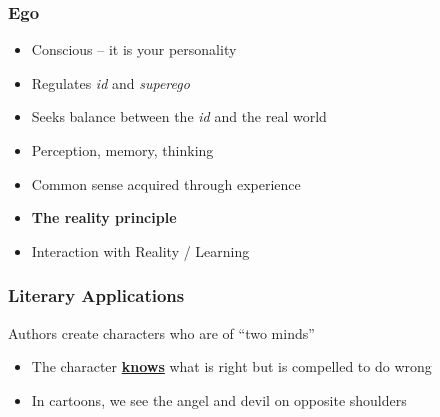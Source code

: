 \documentclass[11pt]{article}
\begin{document}
\subsubsection*{Ego}
\label{sec:org64002c5}
\begin{itemize}
\item Conscious -- it is your personality
\item Regulates \emph{id} and \emph{superego}
\item Seeks balance between the \emph{id} and the real world
\item Perception, memory, thinking
\item Common sense acquired through experience
\item \textbf{The reality principle}
\item Interaction with Reality / Learning
\end{itemize}

\subsubsection*{Literary Applications}
\label{sec:orgc77c244}
Authors create characters who are of ``two minds''

\begin{itemize}
\item The character \uline{\textbf{knows}} what is right but is compelled to do wrong
\item In cartoons, we see the angel and devil on opposite shoulders
\end{itemize}
\end{document}
